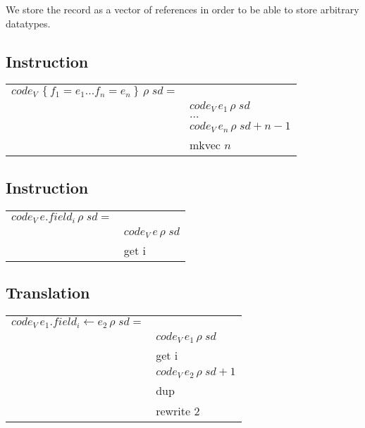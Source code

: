 \documentclass[10pt,a4paper]{article}
\begin{document}
	We store the record as a vector of references in order to be able to store arbitrary datatypes.
	
	\subsection{Instruction}
	
	\begin{tabular}{l l}
		$code_V \, \left\lbrace f_1 = e_1 \dots f_n = e_n \right\rbrace  \, \rho \; sd = $ &\\
		& $code_V \, e_1 \, \rho \; sd$\\
		& $\dots$\\
		& $code_V \, e_n \, \rho \; sd + n - 1$\\
		& mkvec $n$ \\
	\end{tabular}
	
	\subsection{Instruction}
	
	\begin{tabular}{l l}
		$code_V \, e.field_i \, \rho \; sd = $ &\\
		& $code_V \, e \, \rho \; sd$\\
		& get i \\
	\end{tabular}
	
	\subsection{Translation}
	
	\begin{tabular}{l l}
		$code_V \, e_1.field_i \leftarrow e_2 \, \rho \; sd = $ &\\
		& $code_V \, e_1 \, \rho \; sd$\\
		& get i \\
		& $code_V \, e_2 \, \rho \; sd + 1$ \\
		& dup \\
		& rewrite 2 \\
	\end{tabular}
\end{document}
